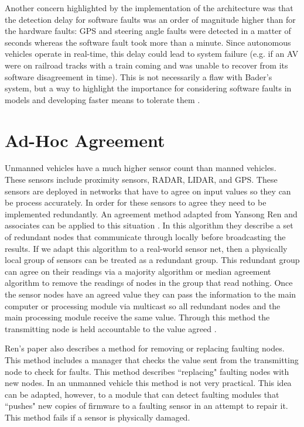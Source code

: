 \documentclass[twoside, conference]{IEEEtran}
\begin{document}
Another concern highlighted by the implementation of the architecture was that the detection delay for software faults was an order of magnitude higher than for the hardware faults: GPS and steering angle faults were detected in a matter of seconds whereas the software fault took more than a minute. Since autonomous vehicles operate in real-time, this delay could lead to system failure (e.g. if an AV were on railroad tracks with a train coming and was unable to recover from its software disagreement in time). This is not necessarily a flaw with Bader's system, but a way to highlight the importance for considering software faults in models and developing faster means to tolerate them \cite{Bader2014}.	
	
\section{Ad-Hoc Agreement}\label{sec:adhoc-agreement}
Unmanned vehicles have a much higher sensor count than manned vehicles. These sensors include proximity sensors, RADAR, LIDAR, and GPS. These sensors are deployed in networks that have to agree on input values so they can be process accurately. In order for these sensors to agree they need to be implemented redundantly. An agreement method adapted from Yansong Ren and associates can be applied to this situation \cite{Ren2001}. In this algorithm they describe a set of redundant nodes that communicate through locally before broadcasting the results. If we adapt this algorithm to a real-world sensor net, then a physically local group of sensors can be treated as a redundant group. This redundant group can agree on their readings via a majority algorithm or median agreement algorithm to remove the readings of nodes in the group that read nothing. Once the sensor nodes have an agreed value they can pass the information to the main computer or processing module via multicast so all redundant nodes and the main processing module receive the same value. Through this method the transmitting node is held accountable to the value agreed \cite{Ren2001}.

Ren's paper also describes a method for removing or replacing faulting nodes. This method includes a manager that checks the value sent from the transmitting node to check for faults. This method describes ``replacing" faulting nodes with new nodes. In an unmanned vehicle this method is not very practical. This idea can be adapted, however, to a module that can detect faulting modules that ``pushes" new copies of firmware to a faulting sensor in an attempt to repair it. This method fails if a sensor is physically damaged.\cite{Ren2001}
\end{document}
